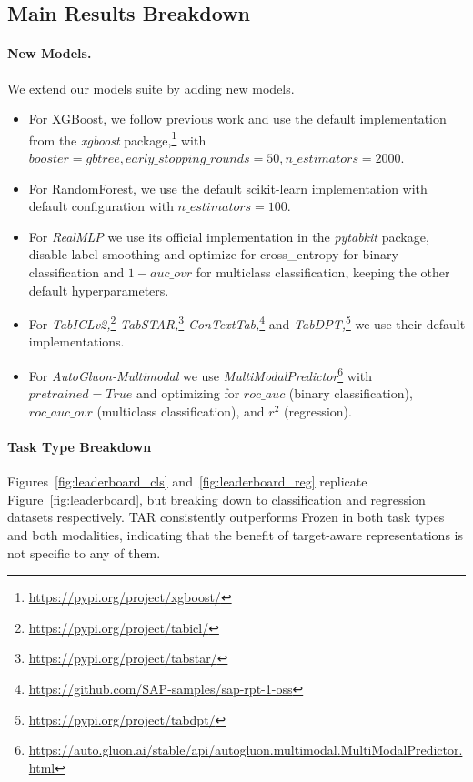 \subsection{Main Results Breakdown}

\paragraph{New Models.} We extend our models suite by adding new models. 

\begin{itemize}
\item For XGBoost, we follow previous work \cite{gorishniy_revisiting_2021, arazi_tabstar_2025} and use the default implementation from the \textit{xgboost} package,\footnote{\url{https://pypi.org/project/xgboost/}} with $booster = gbtree, early\_stopping\_rounds = 50, n\_estimators = 2000$. 

\item For RandomForest, we use the default scikit-learn implementation with default configuration with $n\_estimators = 100$. 

\item For \textit{RealMLP} we use its official implementation in the \textit{pytabkit} package, disable label smoothing and optimize for cross\_entropy for binary classification and
$1-auc\_ovr$ for multiclass classification, keeping the other default hyperparameters. 

\item For \textit{TabICLv2,}\footnote{\url{https://pypi.org/project/tabicl/}} \textit{TabSTAR,}\footnote{\url{https://pypi.org/project/tabstar/}} \textit{ConTextTab,}\footnote{\url{https://github.com/SAP-samples/sap-rpt-1-oss}} and \textit{TabDPT,}\footnote{\url{https://pypi.org/project/tabdpt/}} we use their default implementations.

\item For \textit{AutoGluon-Multimodal} we use \textit{MultiModalPredictor}\footnote{\url{https://auto.gluon.ai/stable/api/autogluon.multimodal.MultiModalPredictor.html}} with $pretrained=True$ and optimizing for $roc\_auc$ (binary classification), $roc\_auc\_ovr$ (multiclass classification), and $r^2$ (regression).
\end{itemize}


\paragraph{Task Type Breakdown} 
Figures~\ref{fig:leaderboard_cls} and~\ref{fig:leaderboard_reg} replicate Figure~\ref{fig:leaderboard}, but breaking down to classification and regression datasets respectively.
TAR consistently outperforms Frozen in both task types and both modalities, indicating that the benefit of target-aware representations is not specific to any of them.

